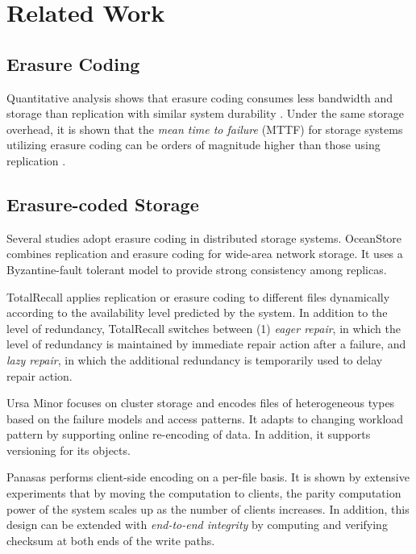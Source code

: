\section{Related Work}
\label{chap:relatedwork}

\subsection{Erasure Coding}

Quantitative analysis shows that erasure coding consumes less bandwidth and
storage than replication with similar system durability
\cite{weatherspoon02,rodrigues05}. Under the same storage overhead, it is shown
that the \textit{mean time to failure} (MTTF) for storage systems utilizing
erasure coding can be orders of magnitude higher than those using replication
\cite{weatherspoon02}.


\subsection{Erasure-coded Storage}

Several studies adopt erasure coding in distributed storage systems.  OceanStore
\cite{kubiatowicz00,rhea03} combines replication and erasure coding for
wide-area network storage.  It uses a Byzantine-fault tolerant model to provide
strong consistency among replicas.

TotalRecall \cite{bhagwan04} applies replication or erasure coding to different
files dynamically according to the availability level predicted by the system.
In addition to the level of redundancy, TotalRecall switches between (1)
\textit{eager repair}, in which the level of redundancy is maintained by
immediate repair action after a failure, and \textit{lazy repair}, in which the
additional redundancy is temporarily used to delay repair action.


Ursa Minor \cite{abd05} focuses on cluster storage and encodes files of
heterogeneous types based on the failure models and access patterns. It adapts
to changing workload pattern by supporting online re-encoding of data. In
addition, it supports versioning for its objects.

Panasas \cite{welch08} performs client-side encoding on a per-file basis. It is
shown by extensive experiments that by moving the computation to clients, the
parity computation power of the system scales up as the number of clients
increases. In addition, this design can be extended with \textit{end-to-end
    integrity} by computing and verifying checksum at both ends of the write
paths.

